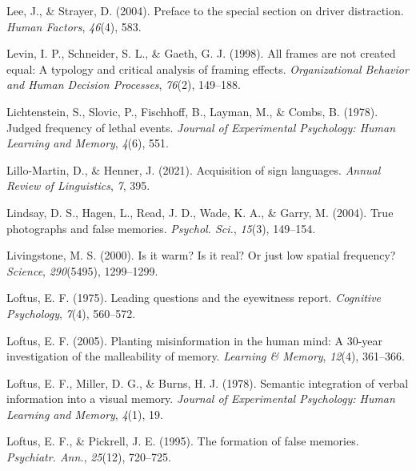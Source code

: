 \documentclass[
]{krantz}
\newlength{\cslhangindent}
\newlength{\cslentryspacingunit} %
\newenvironment{CSLReferences}[2] %
 {%
  \setlength{\parindent}{0pt}
  \ifodd #1
  \let\oldpar\par
  \def\par{\hangindent=\cslhangindent\oldpar}
  \fi
  \setlength{\parskip}{#2\cslentryspacingunit}
 }%
 {}
\begin{document}
\begin{CSLReferences}{1}{0}
\leavevmode{}%
Lee, J., \& Strayer, D. (2004). Preface to the special section on driver distraction. \emph{Human Factors}, \emph{46}(4), 583.

\leavevmode{}%
Levin, I. P., Schneider, S. L., \& Gaeth, G. J. (1998). All frames are not created equal: A typology and critical analysis of framing effects. \emph{Organizational Behavior and Human Decision Processes}, \emph{76}(2), 149--188.

\leavevmode{}%
Lichtenstein, S., Slovic, P., Fischhoff, B., Layman, M., \& Combs, B. (1978). Judged frequency of lethal events. \emph{Journal of Experimental Psychology: Human Learning and Memory}, \emph{4}(6), 551.

\leavevmode{}%
Lillo-Martin, D., \& Henner, J. (2021). Acquisition of sign languages. \emph{Annual Review of Linguistics}, \emph{7}, 395.

\leavevmode{}%
Lindsay, D. S., Hagen, L., Read, J. D., Wade, K. A., \& Garry, M. (2004). True photographs and false memories. \emph{Psychol. Sci.}, \emph{15}(3), 149--154.

\leavevmode{}%
Livingstone, M. S. (2000). Is it warm? Is it real? Or just low spatial frequency? \emph{Science}, \emph{290}(5495), 1299--1299.

\leavevmode{}%
Loftus, E. F. (1975). Leading questions and the eyewitness report. \emph{Cognitive Psychology}, \emph{7}(4), 560--572.

\leavevmode{}%
Loftus, E. F. (2005). Planting misinformation in the human mind: A 30-year investigation of the malleability of memory. \emph{Learning \& Memory}, \emph{12}(4), 361--366.

\leavevmode{}%
Loftus, E. F., Miller, D. G., \& Burns, H. J. (1978). Semantic integration of verbal information into a visual memory. \emph{Journal of Experimental Psychology: Human Learning and Memory}, \emph{4}(1), 19.

\leavevmode{}%
Loftus, E. F., \& Pickrell, J. E. (1995). The formation of false memories. \emph{Psychiatr. Ann.}, \emph{25}(12), 720--725.


\end{CSLReferences}
\end{document}
